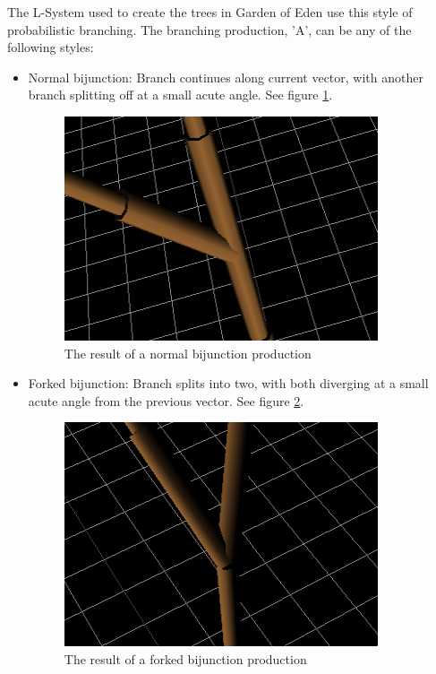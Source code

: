 \documentclass{article}
\newcommand{\tab}{\hspace*{2em}}
\begin{document}
    \tab The L-System used to create the trees in Garden of Eden use this style of probabilistic
branching. The branching production, 'A', can be any of the following styles:
    \begin{itemize}
        \item Normal bijunction: Branch continues along current vector, with another branch
splitting off at a small acute angle. See figure \ref{fig:fig/bijunct}.
        \begin{figure}[h]
            \centering
            \includegraphics{fig/bijunct}
            \caption[Normal Bijunction]{The result of a normal bijunction production}
            \label{fig:fig/bijunct}

        \end{figure}
        \item Forked bijunction: Branch splits into two, with both diverging at a small acute angle
from the previous vector. See figure \ref{fig:fig/fbijunct}.
        \begin{figure}[h]
            \centering
            \includegraphics{fig/fbijunct}
            \caption[Forked Bijunction]{The result of a forked bijunction production}
            \label{fig:fig/fbijunct}


\end{figure}
\end{itemize}
\end{document}
